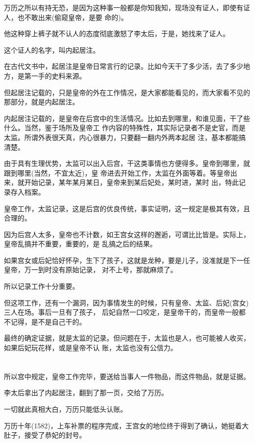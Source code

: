 \documentclass[11pt,a4paper,onecolumn]{article}
\begin{document}
万历之所以有持无恐，是因为这种事一般都是你知我知，现场没有证人，即使有证人，也不敢出来(偷窥皇帝，是要
命的)。

他这种穿上裤子就不认人的态度彻底激怒了李太后，于是，她找来了证人。

这个证人的名字，叫内起居注。

在古代文书中，起居注是皇帝日常言行的记录。比如今天干了多少活，去了多少地方，是第一手的史料来源。

但起居注记载的，只是皇帝的外在工作情况，是大家都能看见的，而大家看不见的那部分，就是内起居注。

内起居注记载的，是皇帝在后宫中的生活情况。比如去到哪里，和谁见面，干了些什么。当然，鉴于场所及皇帝工
作内容的特殊性，其实际记录者不是史官，而是太监。所谓外表很天真，内心很暴力，只要翻一翻内外两本起居
注，基本都能搞清楚。

由于具有生理优势，太监可以出入后宫，干这类事情也方便得多。皇帝到哪里，就跟到哪里(当然，不宜太近)，皇
帝进去开始工作，太监在外面等着。等皇帝出来，就开始记录，某年某月某日，皇帝来到某后妃处，某时进，某时
出，特此记录存入档案。

皇帝工作，太监记录，这是后宫的优良传统，事实证明，这一规定是极其有效，且合理的。

因为后宫人太多，皇帝也不计数，如王宫女这样的邂逅，可谓比比皆是。实际上，皇帝乱搞并不重要，重要的，是
乱搞之后的结果。

如果宫女或后妃恰好怀孕，生下了孩子，这就是龙种，要是儿子，没准就是下一任皇帝，万一到时没有原始记录，
对不上号，那就麻烦了。

所以记录工作十分重要。

但这项工作，还有一个漏洞，因为事情发生的时候，只有皇帝、太监、后妃(宫女)三人在场。事后一旦有了孩子，
后妃自然一口咬定，是皇帝干的，而皇帝一般都不记得，是不是自己干的。

最终的确定证据，就是太监的记录。但问题在于，太监也是人，也可能被人收买，如果后妃玩花样，或是皇帝不认
账，太监也没有公信力。

\section[\thesection]{}

所以宫中规定，皇帝工作完毕，要送给当事人一件物品，而这件物品，就是证据。

李太后拿出了内起居注，翻到了那一页，交给了万历。

一切就此真相大白，万历只能低头认账。

万历十年(1582)，上车补票的程序完成，王宫女的地位终于得到了确认，她挺着大肚子，接受了恭妃的封号。
\end{document}
